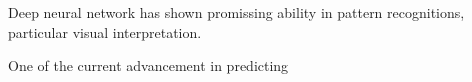 Deep neural network has shown promissing ability in pattern recognitions, particular visual interpretation.
\par 

One of the current advancement in predicting 